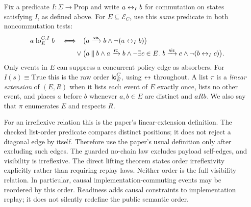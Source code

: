 \begin{definition}
\label{def:order}
Fix a predicate $I:\Sigma\to\mathrm{Prop}$ and write $a\mathrel{\leftrightarrow_I} b$ for
commutation on states satisfying $I$, as defined above.
For $E\subseteq\mathcal E_C$, use this \emph{same} predicate in both
noncommutation tests:
\begin{align*}
 a\mathrel{\operatorname{lo}^{C,I}_{E}}b\quad\Longleftrightarrow\quad
 &\bigl(a\mathrel{\xrightarrow{\mathsf{vis}}} b\land\neg(a\mathrel{\leftrightarrow_I} b)\bigr)\\
 {}\lor{}&\bigl(a\mathbin{\|} b\land a\xrightarrow{\mathsf{rc}}b\land
 \neg\exists c\in E.\ b\mathrel{\xrightarrow{\mathsf{vis}}} c\land\neg(b\mathrel{\leftrightarrow_I} c)\bigr).
\end{align*}
Only events in $E$ can suppress a concurrent policy edge as absorbers.
For $I(s)\equiv\mathrm{True}$ this is the raw order
$\mathsf{lo}^{C}_{E}$, using $\leftrightarrow$ throughout.
A list $\pi$ is a \emph{linear extension} of $(E,R)$ when it lists each event
of $E$ exactly once, lists no other event, and places $a$ before $b$ whenever
$a,b\in E$ are distinct and $aRb$. We also say that $\pi$ enumerates $E$ and respects $R$.
\end{definition}
For an irreflexive relation this is the paper's linear-extension definition.
The checked list-order predicate compares distinct positions; it does not
reject a diagonal edge by itself. Therefore use the paper's usual definition
only after excluding such edges. The guarded no-chain law excludes payload
self-edges, and visibility is irreflexive. The direct lifting theorem states
order irreflexivity explicitly rather than requiring replay laws.
Neither order is the full visibility relation. In particular,
causal implementation-commuting events may be reordered by this order.
Readiness adds causal constraints to implementation replay; it does not
silently redefine the public semantic order.

